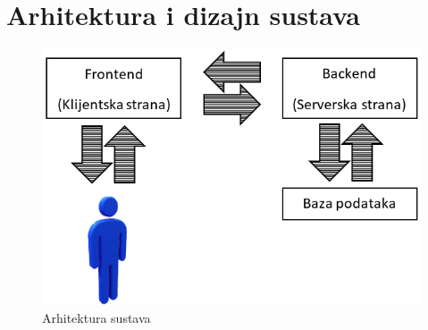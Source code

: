 \chapter{Arhitektura i dizajn sustava}

    \begin{figure}[!h]
		\centering
		\includegraphics[width=13cm]{slike/arhitektura.PNG} 
		\caption{Arhitektura sustava}
		\label{fig:arhitektura}
	\end{figure}

